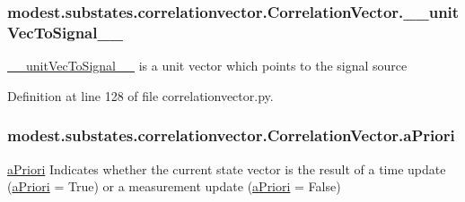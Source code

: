 \subsubsection[{\texorpdfstring{\+\_\+\+\_\+unit\+Vec\+To\+Signal\+\_\+\+\_\+}{__unitVecToSignal__}}]{\setlength{\rightskip}{0pt plus 5cm}modest.\+substates.\+correlationvector.\+Correlation\+Vector.\+\_\+\+\_\+unit\+Vec\+To\+Signal\+\_\+\+\_\+\hspace{0.3cm}{\ttfamily [private]}}\hypertarget{classmodest_1_1substates_1_1correlationvector_1_1CorrelationVector_a4a6aacd90c573941e4f097a034bdb76c}{}\label{classmodest_1_1substates_1_1correlationvector_1_1CorrelationVector_a4a6aacd90c573941e4f097a034bdb76c}


\hyperlink{classmodest_1_1substates_1_1correlationvector_1_1CorrelationVector_a4a6aacd90c573941e4f097a034bdb76c}{\+\_\+\+\_\+unit\+Vec\+To\+Signal\+\_\+\+\_\+} is a unit vector which points to the signal source 



Definition at line 128 of file correlationvector.\+py.

\subsubsection[{\texorpdfstring{a\+Priori}{aPriori}}]{\setlength{\rightskip}{0pt plus 5cm}modest.\+substates.\+correlationvector.\+Correlation\+Vector.\+a\+Priori}\hypertarget{classmodest_1_1substates_1_1correlationvector_1_1CorrelationVector_a9af2ca612576e52c84e98757e53085a8}{}\label{classmodest_1_1substates_1_1correlationvector_1_1CorrelationVector_a9af2ca612576e52c84e98757e53085a8}


\hyperlink{classmodest_1_1substates_1_1correlationvector_1_1CorrelationVector_a9af2ca612576e52c84e98757e53085a8}{a\+Priori} Indicates whether the current state vector is the result of a time update (\hyperlink{classmodest_1_1substates_1_1correlationvector_1_1CorrelationVector_a9af2ca612576e52c84e98757e53085a8}{a\+Priori} = True) or a measurement update (\hyperlink{classmodest_1_1substates_1_1correlationvector_1_1CorrelationVector_a9af2ca612576e52c84e98757e53085a8}{a\+Priori} = False) 



